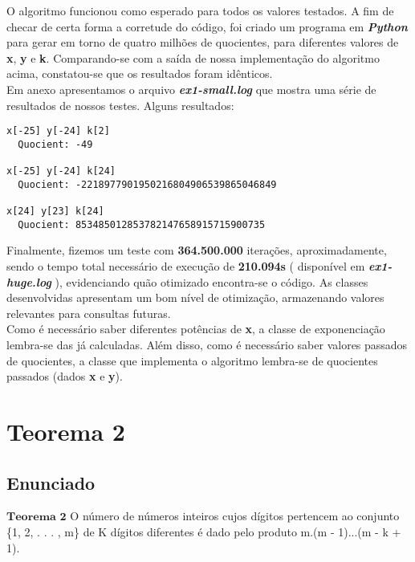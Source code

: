 \documentclass[twoside]{article}
\begin{document}
\begin{multicols}{2}
\indent O algoritmo funcionou como esperado para todos os valores testados. A fim de checar de certa forma a corretude do código, foi criado um programa em \textbf{\textit{Python}} para gerar em torno de quatro milhões de quocientes, para diferentes valores de \textbf{x}, \textbf{y} e \textbf{k}. Comparando-se com a saída de nossa implementação do algoritmo acima, constatou-se que os resultados foram idênticos.\\

\indent Em anexo apresentamos o arquivo \textbf{\textit{ex1-small.log}} que mostra uma série de resultados de nossos testes. Alguns resultados:

\begin{lstlisting}
x[-25] y[-24] k[2]
  Quocient: -49

x[-25] y[-24] k[24]
  Quocient: -2218977901950216804906539865046849

x[24] y[23] k[24]
  Quocient: 853485012853782147658915715900735

\end{lstlisting}

\indent Finalmente, fizemos um teste com \textbf{364.500.000} iterações, aproximadamente, sendo o tempo total necessário de execução de \textbf{210.094s} ( disponível em \textbf{\textit{ex1-huge.log}} ), evidenciando quão otimizado encontra-se o código. As classes desenvolvidas apresentam um bom nível de otimização, armazenando valores relevantes para consultas futuras.\\

\indent Como é necessário saber diferentes potências de \textbf{x}, a classe de exponenciação lembra-se das já calculadas. Além disso, como é necessário saber valores passados de quocientes, a classe que implementa o algoritmo lembra-se de quocientes passados (dados \textbf{x} e \textbf{y}).



\newpage
\section{Teorema 2}

\subsection{ Enunciado }
\indent $\mathbf{Teorema}$ $\mathbf{2}$ O número de números inteiros cujos dígitos pertencem ao conjunto \{1, 2, . . . , m\} de
K dígitos diferentes é dado pelo produto m.(m - 1)...(m - k + 1).\\


\end{multicols}
\end{document}
